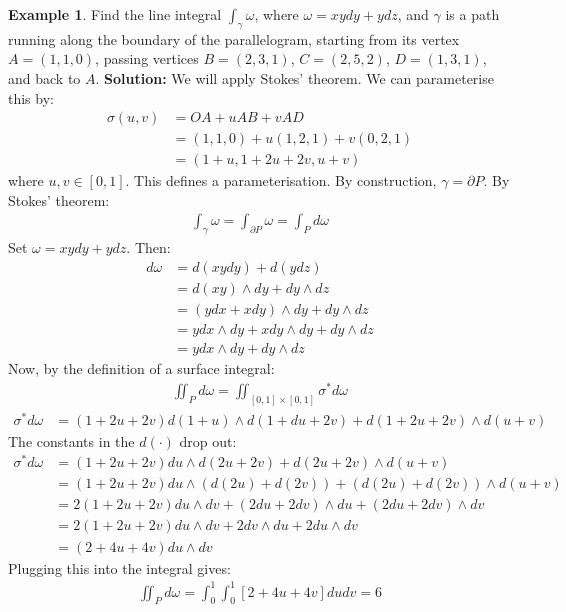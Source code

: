 \documentclass[11pt]{scrartcl}
\theoremstyle{definition}
\newtheorem{ex}{Example}
\theoremstyle{remark}
\newcommand{\idx}[2]{\int_{#1}^{#2}}
\begin{document}
{\begin{ex}
	Find the line integral $\idx{\gamma}{} \omega$, where $\omega = xy dy + ydz$, and $\gamma$ is a path running along the boundary of the parallelogram, starting from its vertex $A = (1,1,0)$, passing vertices $B = (2,3,1)$, $C 	= (2,5,2)$, $D = (1,3,1)$, and back to $A$. 
	\newline
	\newline
	\textbf{Solution:} We will apply Stokes' theorem. We can parameterise this by: 
	\begin{align*}
		\sigma(u,v) & = OA + u AB + v AD \\
					& = (1,1,0) + u(1,2,1) + v(0,2,1) \\
					& = (1+u, 1+2u + 2v, u+v) 
	\end{align*}
	where $u,v \in [0,1]$. This defines a parameterisation. By construction, $\gamma = \partial P$. By Stokes' theorem: 
	\begin{align*}
		\idx{\gamma}{} \omega = \idx{\partial P}{} \omega = \idx{P}{} d \omega 
	\end{align*}
	Set $\omega = xy dy + y dz$. Then: 
	\begin{align*}
		d \omega & = d (xy dy ) + d(ydz) \\
				& = d(xy) \wedge dy + dy \wedge dz \\
				& = (ydx + xdy ) \wedge dy + dy \wedge dz \\
				& = y dx \wedge dy + x dy \wedge dy + dy \wedge dz \\
				& = y dx \wedge dy + dy \wedge dz 
	\end{align*}
	Now, by the definition of a surface integral: 
	\begin{align*}
		\iint_P d \omega = \iint_{[0, 1] \times [0,1]} \sigma^* d \omega 
	\end{align*}
	\begin{align*}
		\sigma^* d \omega & = (1+2u+2v) d (1+u) \wedge d(1+du + 2v) + d(1 + 2u + 2v) \wedge d(u+v ) 
	\end{align*}
	The constants in the $d( \cdot )$ drop out: 
	\begin{align*}
		\sigma^* d \omega & = (1+2u+2v) du \wedge d(2u + 2v) + d (2u + 2v) \wedge d(u+v) \\
		& = (1+2u+2v) du \wedge (d(2u) + d(2v)) + (d(2u) + d(2v)) \wedge d(u+v) \\
		& = 2 (1+2u+2v) du \wedge dv + (2du + 2dv) \wedge du + (2 du + 2 dv) \wedge dv \\
		& = 2 (1+2u+2v) du \wedge dv + 2 dv \wedge du + 2 du \wedge dv \\
		& = (2+4u + 4v) du \wedge dv
	\end{align*}
	Plugging this into the integral gives: 
	\begin{align*}
		\iint_P d \omega = \idx{0}{1} \idx{0}{1} [2 + 4u + 4v] du dv = 6
	\end{align*}
\end{ex}



}
\end{document}
